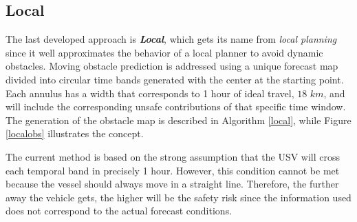 \subsection{Local} 
The last developed approach is \textbf{\textit{Local}}, which gets its name from \textit{local planning} since it well approximates the behavior of a local planner to avoid dynamic obstacles. Moving obstacle prediction is addressed using a unique forecast map divided into circular time bands generated with the center at the starting point. Each annulus has a width that corresponds to 1 hour of ideal travel, $18$ $km$, and will include the corresponding unsafe contributions of that specific time window. The generation of the obstacle map is described in Algorithm \ref{local}, while Figure \ref{localobs} illustrates the concept.

The current method is based on the strong assumption that the USV will cross each temporal band in precisely 1 hour. However, this condition cannot be met because the vessel should always move in a straight line. Therefore, the further away the vehicle gets, the higher will be the safety risk since the information used does not correspond to the actual forecast conditions.
\begin{algorithm}[!htbp]
\end{algorithm}
